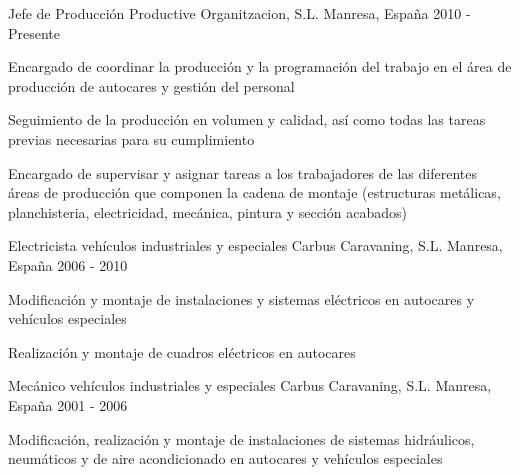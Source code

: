 

\begin{cventries}

  \cventry
    {Jefe de Producción} %
    {Productive Organitzacion, S.L.} %
    {Manresa, España} %
    {2010 - Presente} %
    {
      \begin{cvitems} %
        \item {Encargado de coordinar la producción y la programación del trabajo en el área de producción de autocares y gestión del personal}
        \item {Seguimiento de la producción en volumen y calidad, así como todas las tareas previas necesarias para su cumplimiento}
        \item {Encargado de supervisar y asignar tareas a los trabajadores de las diferentes áreas de producción que componen la cadena de montaje (estructuras metálicas, planchisteria, electricidad, mecánica, pintura y sección acabados)}
      \end{cvitems}
    }

  \cventry
    {Electricista vehículos industriales y especiales} %
    {Carbus Caravaning, S.L.} %
    {Manresa, España} %
    {2006 - 2010} %
    {
      \begin{cvitems} %
        \item {Modificación y montaje de instalaciones y sistemas eléctricos en autocares y vehículos especiales}
        \item {Realización y montaje de cuadros eléctricos en autocares}
      \end{cvitems}
    }

  \cventry
    {Mecánico vehículos industriales y especiales} %
    {Carbus Caravaning, S.L.} %
    {Manresa, España} %
    {2001 - 2006} %
    {
      \begin{cvitems} %
        \item {Modificación, realización y montaje de instalaciones de sistemas hidráulicos, neumáticos y de aire acondicionado en autocares y vehículos especiales}
      \end{cvitems}
    }


\end{cventries}
